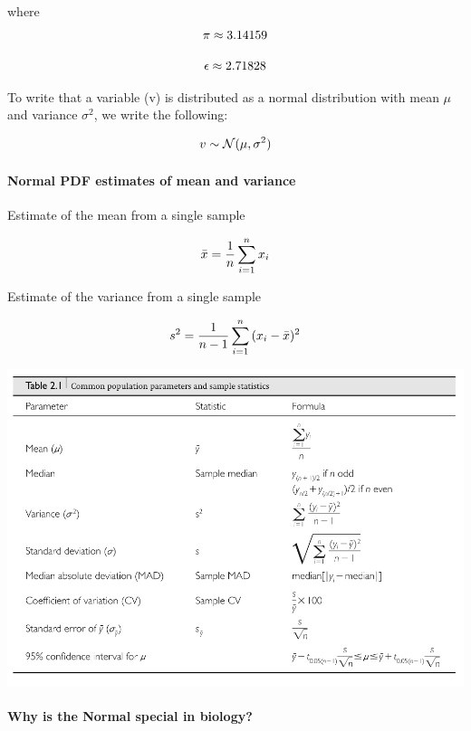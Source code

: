 \documentclass[]{book}
\let\oldparagraph\paragraph
\renewcommand{\paragraph}[1]{\oldparagraph{#1}\mbox{}}
\begin{document}
where
\[\large \pi \approx 3.14159\]

\[\large \epsilon \approx 2.71828\]

To write that a variable (v) is distributed as a normal distribution with mean \(\mu\) and variance \(\sigma^2\), we write the following:

\[\large v \sim \mathcal{N} (\mu,\sigma^2)\]

\hypertarget{normal-pdf-estimates-of-mean-and-variance}{%
\paragraph{Normal PDF \textbar{} estimates of mean and variance}\label{normal-pdf-estimates-of-mean-and-variance}}

Estimate of the mean from a single sample

\[\Large \bar{x} = \frac{1}{n}\sum_{i=1}^{n}{x_i} \]

Estimate of the variance from a single sample

\[\Large s^2 = \frac{1}{n-1}\sum_{i=1}^{n}{(x_i - \bar{x})^2} \]

\begin{center}\includegraphics[width=0.9\linewidth]{images/week_2.010} \end{center}

\hypertarget{why-is-the-normal-special-in-biology}{%
\paragraph{Why is the Normal special in biology?}\label{why-is-the-normal-special-in-biology}}
\end{document}
